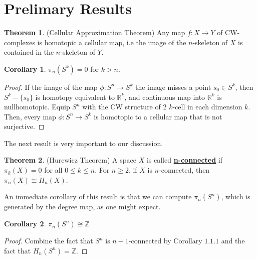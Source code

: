\documentclass{article}
\theoremstyle{definition}
\newtheorem{theorem}{Theorem}[section]
\theoremstyle{definition}
\theoremstyle{definition}
\theoremstyle{definition}
\theoremstyle{definition}
\theoremstyle{definition}
\newtheorem{corollary}{Corollary}[theorem]
\theoremstyle{definition}
\begin{document}
\section{Prelimary Results}

\begin{tcolorbox}[colback=red!5!white,colframe=red!30!white]
\begin{theorem}
(Cellular Approximation Theorem) Any map $f: X\to Y$ of CW-complexes is homotopic a cellular map, i.e the image of the $n$-skeleton of $X$ is contained in the $n$-skeleton of $Y$.
\end{theorem}
\end{tcolorbox}

\begin{tcolorbox}[colback=green!5!white,colframe=green!30!white]
\begin{corollary}
$\pi_n(S^k)=0$ for $k>n$.
\end{corollary}
\end{tcolorbox}
\begin{proof}
    If the image of the map $\phi: S^n\to S^k$ the image misses a point $s_0\in S^k$, then $S^k-\{s_0\}$ is homotopy equivalent to $\mathbb{R}^{k}$, and continuous map into $\mathbb{R}^{k}$ is nullhomotopic. Equip $S^n$ with the CW structure of $2$ $k$-cell in each dimension $k$. Then, every map $\phi: S^n\to S^k$ is homotopic to a cellular map that is not surjective.
\end{proof}

The next result is very important to our discussion. 

\begin{tcolorbox}[colback=red!5!white,colframe=red!30!white]
\begin{theorem}
(Hurewicz Theorem) A space $X$ is called \underline{\textbf{n-connected}} if $\pi_k(X)=0$ for all $0\leq k\leq n$. For $n\geq 2$, if $X$ is $n$-connected, then $\pi_n(X)\cong \tilde{H}_n(X)$.
\end{theorem}
\end{tcolorbox}
An immediate corollary of this result is that we can compute $\pi_n(S^n)$, which is generated by the degree map, as one might expect.
\begin{tcolorbox}[colback=green!5!white,colframe=green!30!white]
\begin{corollary}
$\pi_n(S^n)\cong \mathbb{Z}$
\end{corollary}
\end{tcolorbox}
\begin{proof}
    Combine the fact that $S^n$ is $n-1$-connected by Corollary $1.1.1$ and the fact that $H_n(S^n)=\mathbb{Z}$.
\end{proof}
\end{document}
